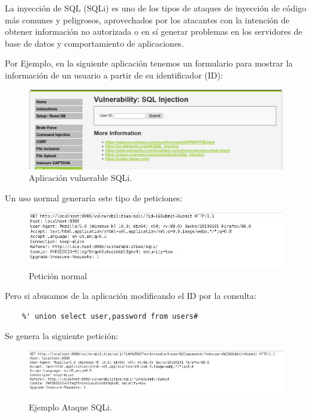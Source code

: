 La inyección de SQL (SQLi) es uno de los tipos de ataques de inyección de código más
comunes y peligrosos, aprovechados por los atacantes con la intención de obtener
información no autorizada o en sí generar problemas en los servidores de base de datos y
comportamiento de aplicaciones.

Por Ejemplo, en la siguiente aplicación tenemos un formulario para mostrar 
la información de un usuario a partir de su identificador (ID):

\begin{figure}[!htb]  
    \includegraphics[width=\linewidth]{./imagenes/013_SQLi_Example_1.png}
    \caption{Aplicación vulnerable SQLi.}  
\end{figure}

Un uso normal generaría este tipo de peticiones:

\begin{figure}[!htb]  
    \centering
    \captionsetup{width=1\linewidth}
    \includegraphics[width=\linewidth]{./imagenes/013_SQLi_Example_2.png}
    \caption{Petición normal}  
\end{figure}

\newpage
Pero si abusamos de la aplicación modificando el ID por la consulta:\\
\begin{verbatim}
    %' union select user,password from users# 
\end{verbatim}

Se genera la siguiente petición:\\
\begin{figure}[!htb]
    \centering
    \captionsetup{width=1\linewidth}  
    \includegraphics[width=\linewidth]{./imagenes/013_SQLi_Example_3.png}
    \caption{Ejemplo Ataque SQLi.}  
    \label{fig:4 - SQLi 3}
\end{figure}

